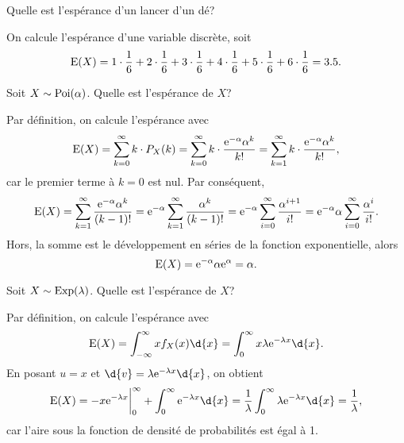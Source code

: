 \documentclass[11pt]{article}
\newcommand\e{%
	\ensuremath{%
		\mathrm{e}%
	}%
}%
\newcommand\poi{%
	\ensuremath{%
		\mathrm{Poi}%
	}%
}%
\newcommand\Exp{%
	\ensuremath{%
		\mathrm{Exp}%
	}%
}%
\newcommand\Esp{%
	\ensuremath{%
		\mathrm{E}%
	}%
}%
\begin{document}
\begin{exemple}
	Quelle est l'espérance d'un lancer d'un dé?

	On calcule l'espérance d'une variable discrète, soit
	\begin{equation*}
		\Esp(X)=
			1\cdot\frac{1}{6}+
			2\cdot\frac{1}{6}+
			3\cdot\frac{1}{6}+
			4\cdot\frac{1}{6}+
			5\cdot\frac{1}{6}+
			6\cdot\frac{1}{6}
		=3.5.
	\end{equation*}
\end{exemple}

\begin{exemple}
	Soit $X\sim\poi(\alpha)$. Quelle est l'espérance de $X$?

	Par définition, on calcule l'espérance avec
	\begin{equation*}
		\Esp(X)
		=\sum_{k=0}^\infty k\cdot P_X(k)
		=\sum_{k=0}^\infty k\cdot\frac{\e^{-\alpha}\alpha^k}{k!}
		=\sum_{k=1}^\infty k\cdot\frac{\e^{-\alpha}\alpha^k}{k!},
	\end{equation*}
	car le premier terme à $k=0$ est nul. Par conséquent,
	\begin{equation*}
		\Esp(X)
		=\sum_{k=1}^\infty\frac{\e^{-\alpha}\alpha^k}{(k-1)!}
		=\e^{-\alpha}\sum_{k=1}^\infty\frac{\alpha^k}{(k-1)!}
		=\e^{-\alpha}\sum_{i=0}^\infty\frac{\alpha^{i+1}}{i!}
		=\e^{-\alpha}\alpha\sum_{i=0}^\infty\frac{\alpha^i}{i!}.
	\end{equation*}
	Hors, la somme est le développement en séries de la fonction exponentielle,
	alors
	\begin{equation*}
		\Esp(X)
		=\e^{-\alpha}\alpha\e^{\alpha}
		=\alpha.
	\end{equation*}
\end{exemple}

\begin{exemple}
	Soit $X\sim\Exp(\lambda)$. Quelle est l'espérance de $X$?

	Par définition, on calcule l'espérance avec
	\begin{equation*}
		\Esp(X)
		=\int_{-\infty}^\infty xf_X(x)\d{x}
		=\int_0^\infty x\lambda\e^{-\lambda x}\d{x}.
	\end{equation*}
	En posant $u=x$ et $\d{v}=\lambda\e^{-\lambda x}\d{x}$, on obtient
	\begin{equation*}
		\Esp(X)
		=-x\e^{-\lambda x}\bigg\rvert_0^\infty
		+\int_0^\infty\e^{-\lambda x}\d{x}
		=\frac{1}{\lambda}\int_0^\infty\lambda\e^{-\lambda x}\d{x}
		=\frac{1}{\lambda},
	\end{equation*}
	car l'aire sous la fonction de densité de probabilités est égal à 1.
\end{exemple}
\end{document}
